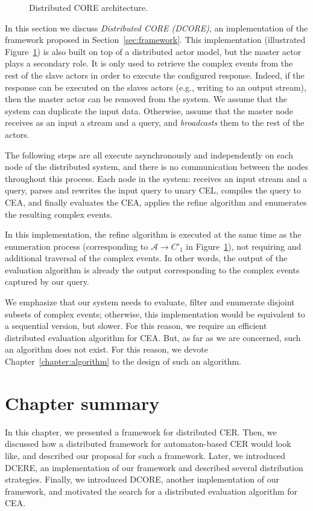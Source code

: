 \begin{figure}[t]
  \centering
  \caption{Distributed CORE architecture.}
  \label{fig:dcore}
\end{figure}

In this section we discuss \emph{Distributed CORE (DCORE)}, an implementation of the framework proposed in Section~\ref{sec:framework}. This implementation (illustrated Figure~\ref{fig:dcore}) is also built on top of a distributed actor model, but the master actor plays a secondary role. It is only used to retrieve the complex events from the rest of the slave actors in order to execute the configured response. Indeed, if the response can be executed on the slaves actors (e.g., writing to an output stream), then the master actor can be removed from the system. We assume that the system can duplicate the input data. Otherwise, assume that the master node receives as an input a stream and a query, and \emph{broadcasts} them to the rest of the actors.

The following steps are all execute asynchronously and independently on each node of the distributed system, and there is no communication between the nodes throughout this process. Each node in the system: receives an input stream and a query, parses and rewrites the input query to unary CEL, compiles the query to CEA, and finally evaluates the CEA, applies the refine algorithm and enumerates the resulting complex events.

In this implementation, the refine algorithm is executed at the same time as the enumeration process (corresponding to $\mathcal{A} \to C'_{1}$ in Figure~\ref{fig:dcore}), not requiring and additional traversal of the complex events. In other words, the output of the evaluation algorithm is already the output corresponding to the complex events captured by our query.

We emphasize that our system needs to evaluate, filter and enumerate disjoint subsets of complex events; otherwise, this implementation would be equivalent to a sequential version, but slower. For this reason, we require an efficient distributed evaluation algorithm for CEA. But, as far as we are concerned, such an algorithm does not exist. For this reason, we devote Chapter~\ref{chapter:algorithm} to the design of such an algorithm.

\section{Chapter summary}

In this chapter, we presented a framework for distributed CER. Then, we discussed how a distributed framework for automaton-based CER would look like, and described our proposal for such a framework. Later, we introduced DCERE, an implementation of our framework and described several distribution strategies. Finally, we introduced DCORE, another implementation of our framework, and motivated the search for a distributed evaluation algorithm for CEA.
